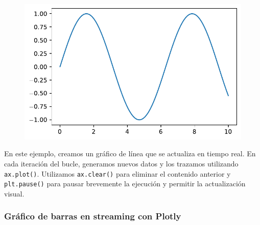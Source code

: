 \documentclass[
  a4paper,
]{article}
\begin{document}
\begin{figure}[H]

{\centering \includegraphics{index_files/figure-pdf/cell-5-output-1.pdf}

}

\end{figure}

En este ejemplo, creamos un gráfico de línea que se actualiza en tiempo
real. En cada iteración del bucle, generamos nuevos datos y los trazamos
utilizando \texttt{ax.plot()}. Utilizamos \texttt{ax.clear()} para
eliminar el contenido anterior y \texttt{plt.pause()} para pausar
brevemente la ejecución y permitir la actualización visual.

\hypertarget{gruxe1fico-de-barras-en-streaming-con-plotly}{%
\subsubsection{Gráfico de barras en streaming con
Plotly}\label{gruxe1fico-de-barras-en-streaming-con-plotly}}
\end{document}
